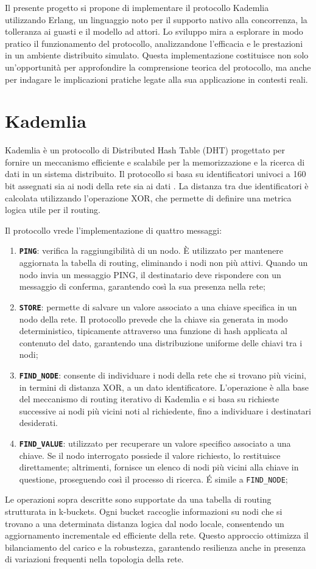 \documentclass{article}
\begin{document}
Il presente progetto si propone di implementare il protocollo Kademlia utilizzando Erlang, un linguaggio noto per il supporto nativo alla concorrenza, la tolleranza ai guasti e il modello ad attori. Lo sviluppo mira a esplorare in modo pratico il funzionamento del protocollo, analizzandone l'efficacia e le prestazioni in un ambiente distribuito simulato. Questa implementazione costituisce non solo un'opportunità per approfondire la comprensione teorica del protocollo, ma anche per indagare le implicazioni pratiche legate alla sua applicazione in contesti reali.

\section{Kademlia}
Kademlia è un protocollo di Distributed Hash Table (DHT) progettato per fornire un meccanismo efficiente e scalabile per la memorizzazione e la ricerca di dati in un sistema distribuito. Il protocollo si basa su identificatori univoci a 160 bit assegnati sia ai nodi della rete sia ai dati \cite{kad}. La distanza tra due identificatori è calcolata utilizzando l'operazione XOR, che permette di definire una metrica logica utile per il routing.

Il protocollo vrede l'implementazione di quattro messaggi:
\begin{enumerate}
    \item {\bf \texttt{PING}}: verifica la raggiungibilità di un nodo. È utilizzato per mantenere aggiornata la tabella di routing, eliminando i nodi non più attivi. Quando un nodo invia un messaggio PING, il destinatario deve rispondere con un messaggio di conferma, garantendo così la sua presenza nella rete;
    \item {\bf \texttt{STORE}}: permette di salvare un valore associato a una chiave specifica in un nodo della rete. Il protocollo prevede che la chiave sia generata in modo deterministico, tipicamente attraverso una funzione di hash applicata al contenuto del dato, garantendo una distribuzione uniforme delle chiavi tra i nodi;
    \item {\bf \texttt{FIND\_NODE}}: consente di individuare i nodi della rete che si trovano più vicini, in termini di distanza XOR, a un dato identificatore. L'operazione è alla base del meccanismo di routing iterativo di Kademlia e si basa su richieste successive ai nodi più vicini noti al richiedente, fino a individuare i destinatari desiderati.
    \item {\bf \texttt{FIND\_VALUE}}: utilizzato per recuperare un valore specifico associato a una chiave. Se il nodo interrogato possiede il valore richiesto, lo restituisce direttamente; altrimenti, fornisce un elenco di nodi più vicini alla chiave in questione, proseguendo così il processo di ricerca. \'E simile a \texttt{FIND\_NODE};
\end{enumerate}
Le operazioni sopra descritte sono supportate da una tabella di routing strutturata in k-buckets. Ogni bucket raccoglie informazioni su nodi che si trovano a una determinata distanza logica dal nodo locale, consentendo un aggiornamento incrementale ed efficiente della rete. Questo approccio ottimizza il bilanciamento del carico e la robustezza, garantendo resilienza anche in presenza di variazioni frequenti nella topologia della rete.
\end{document}
